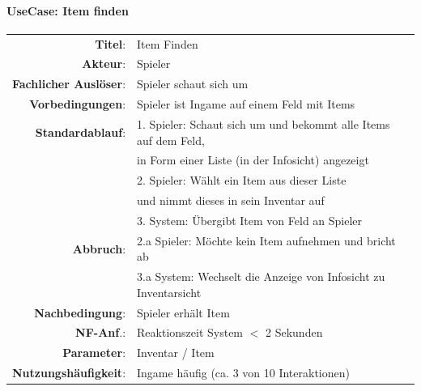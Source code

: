 \paragraph{UseCase: Item finden}
\begin{center}
	\begin{tabular}{|r l|}
	  \hline
	  \textbf{Titel}: & Item Finden \\
	  \textbf{Akteur}: & Spieler \\
	  \textbf{Fachlicher Auslöser}: & Spieler schaut sich um \\
	  \textbf{Vorbedingungen}: & Spieler ist Ingame auf einem Feld mit Items\\
	  \hline
	  \textbf{Standardablauf}:
		& 1. Spieler: Schaut sich um und bekommt alle Items auf dem Feld,\\
	    & in Form einer Liste (in der Infosicht) angezeigt \\
		& 2. Spieler: Wählt ein Item aus dieser Liste\\
		& und nimmt dieses in sein Inventar auf \\
		& 3. System:  Übergibt Item von Feld an Spieler \\ 
	 \textbf{Abbruch}:
                & 2.a Spieler: Möchte kein Item aufnehmen und bricht ab\\
                & 3.a System: Wechselt die Anzeige von Infosicht zu Inventarsicht\\
	  \hline
	  \textbf{Nachbedingung}: & Spieler erhält Item \\
	  \textbf{NF-Anf}.: & Reaktionszeit System $<$ 2 Sekunden \\
	  \textbf{Parameter}: & Inventar / Item \\
	  \textbf{Nutzungshäufigkeit}: & \gls{Ingame} häufig (ca. 3 von 10 Interaktionen) \\
	  \hline
	\end{tabular}
\end{center}

